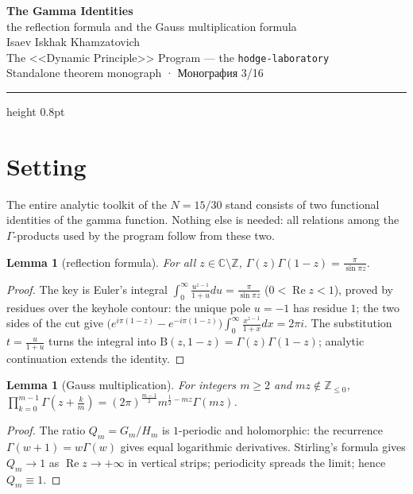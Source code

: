 \documentclass[11pt,a4paper]{article}
\theoremstyle{plain}
\newtheorem{lemma}[theorem]{Lemma}
\theoremstyle{definition}
\theoremstyle{remark}
\newcommand{\CC}{\mathbb{C}}
\newcommand{\ZZ}{\mathbb{Z}}
\newcommand{\Ga}{\Gamma}
\newcommand{\Bfun}{\mathrm{B}}
\newcommand{\re}{\operatorname{Re}}
\begin{document}
\begin{center}
{\LARGE\bfseries The Gamma Identities}\\[0.4em]
{\large the reflection formula and the Gauss multiplication formula}\\[0.6em]
{\normalsize Isaev Iskhak Khamzatovich}\\[0.2em]
{\normalsize The <<Dynamic Principle>> Program --- the \texttt{hodge-laboratory}}\\[0.15em]
{\small Standalone theorem monograph · Монография 3/16}
\end{center}
\vspace{0.4em}
{\color{linkblue}\hrule height 0.8pt}
\vspace{0.8em}

\section{Setting}

The entire analytic toolkit of the $N=15/30$ stand consists of two
functional identities of the gamma function. Nothing else is needed:
all relations among the $\Ga$-products used by the program follow
from these two.

\begin{lemma}[reflection formula]\label{lem:reflection}
For all $z\in\CC\setminus\ZZ$,
$\Ga(z)\Ga(1-z)=\frac{\pi}{\sin\pi z}$.
\end{lemma}

\begin{proof}
The key is Euler's integral
$\int_0^\infty\frac{u^{z-1}}{1+u}du=\frac{\pi}{\sin\pi z}$
($0<\re z<1$), proved by residues over the keyhole contour: the
unique pole $u=-1$ has residue $1$; the two sides of the cut give
$\bigl(e^{i\pi(1-z)}-e^{-i\pi(1-z)}\bigr)\int_0^\infty
\frac{x^{z-1}}{1+x}dx=2\pi i$. The substitution $t=\frac{u}{1+u}$
turns the integral into $\Bfun(z,1-z)=\Ga(z)\Ga(1-z)$; analytic
continuation extends the identity.
\end{proof}

\begin{lemma}[Gauss multiplication]\label{lem:gauss}
For integers $m\ge2$ and $mz\notin\ZZ_{\le0}$,
$\prod_{k=0}^{m-1}\Ga(z+\tfrac km)=(2\pi)^{\frac{m-1}2}
m^{\frac12-mz}\Ga(mz)$.
\end{lemma}

\begin{proof}
The ratio $Q_m=G_m/H_m$ is $1$-periodic and holomorphic: the
recurrence $\Ga(w+1)=w\Ga(w)$ gives equal logarithmic derivatives.
Stirling's formula gives $Q_m\to1$ as $\re z\to+\infty$ in vertical
strips; periodicity spreads the limit; hence $Q_m\equiv1$.
\end{proof}
\end{document}
